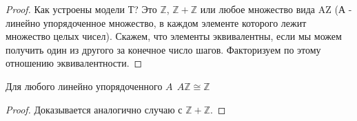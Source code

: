 \documentclass{article}
\begin{document}
\begin{proof}
Как устроены модели Т? Это $\mathbb{Z}$, $\mathbb{Z}+\mathbb{Z}$ или любое множество вида AZ (А - линейно упорядоченное множество, в каждом элементе которого лежит множество целых чисел).
Скажем, что элементы эквивалентны, если мы можем получить один из другого за конечное число шагов. Факторизуем по этому отношению эквивалентности.
\end{proof}

\begin{lemma}Для любого линейно упорядоченного $A \: \: A  \mathbb{Z} \cong  \mathbb{Z}$
\begin{proof}
Доказывается аналогично случаю с $\mathbb{Z}+\mathbb{Z}$.
\end{proof}
\end{lemma}
\end{document}
